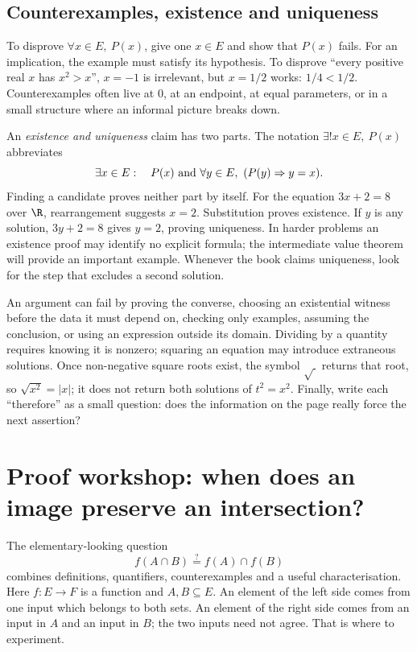 \subsection*{Counterexamples, existence and uniqueness}

To disprove $\forall x\in E,\ P(x)$, give one $x\in E$ and show that $P(x)$ fails.
For an implication, the example must satisfy its hypothesis. To disprove
``every positive real $x$ has $x^2>x$'', $x=-1$ is irrelevant, but $x=1/2$ works:
$1/4<1/2$. Counterexamples often live at $0$, at an endpoint, at equal parameters,
or in a small structure where an informal picture breaks down.

An \emph{existence and uniqueness} claim has two parts. The notation
$\exists!x\in E,\ P(x)$ abbreviates
\[
\exists x\in E:\quad P(x)\ \hbox{and}\
\forall y\in E,\ (P(y)\Rightarrow y=x).
\]
Finding a candidate proves neither part by itself. For the equation $3x+2=8$
over $\R$, rearrangement suggests $x=2$. Substitution proves existence.
If $y$ is any solution, $3y+2=8$ gives $y=2$, proving uniqueness.
In harder problems an existence proof may identify no explicit formula; the
intermediate value theorem will provide an important example. Whenever the book
claims uniqueness, look for the step that excludes a second solution.

\begin{reminder}
An argument can fail by proving the converse, choosing an existential witness
before the data it must depend on, checking only examples, assuming the conclusion,
or using an expression outside its domain. Dividing by a quantity requires knowing
it is nonzero; squaring an equation may introduce extraneous solutions. Once
non-negative square roots exist, the symbol $\sqrt{\ }$ returns that root, so
$\sqrt{x^2}=|x|$; it does not return both solutions of $t^2=x^2$.
Finally, write each ``therefore'' as a small question: does the information on
the page really force the next assertion?
\end{reminder}

\section{Proof workshop: when does an image preserve an intersection?}

The elementary-looking question
\[
f(A\cap B)\stackrel{?}=f(A)\cap f(B)
\]
combines definitions, quantifiers, counterexamples and a useful characterisation.
Here $f:E\to F$ is a function and $A,B\subseteq E$. An element of the left side
comes from one input which belongs to both sets. An element of the right side
comes from an input in $A$ and an input in $B$; the two inputs need not agree.
That is where to experiment.

